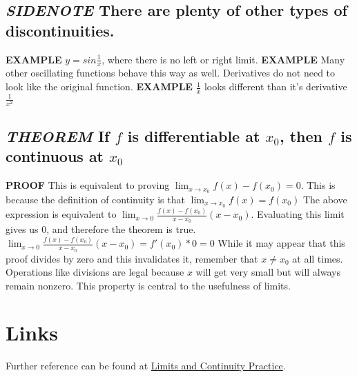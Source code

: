\documentclass[letterpaper]{article}
\begin{document}
\subsection{\emph{SIDENOTE} There are plenty of other types of discontinuities.}
\label{sec:org0b80d2d}
\textbf{EXAMPLE} \(y = sin \frac{1}{x}\), where there is no left or right limit.
\textbf{EXAMPLE} Many other oscillating functions behave this way as well.
Derivatives do not need to look like the original function.
\textbf{EXAMPLE} \(\frac{1}{x}\) looks different than it's derivative \(\frac{1}{x^2}\)
\subsection{\emph{THEOREM} If \(f\) is differentiable at \(x_0\), then \(f\) is continuous at \(x_0\)}
\label{sec:org248d62a}
\textbf{PROOF}
This is equivalent to proving \(\lim_{x \rightarrow x_0} f(x) - f(x_0) = 0\).
  This is because the definition of continuity is that \(\lim_{x \rightarrow x_0} f(x) = f(x_0)\)
The above expression is equivalent to \(\lim_{x\rightarrow0} \frac{f(x) - f(x_0)}{x-x_0} (x-x_0)\).
Evaluating this limit gives us 0, and therefore the theorem is true.
\(\lim_{x\rightarrow0} \frac{f(x) - f(x_0)}{x-x_0} (x-x_0) = f'(x_0) * 0 = 0\)
While it may appear that this proof divides by zero and this invalidates it, remember that \(x \neq x_0\) at all times. Operations like divisions are legal because \(x\) will get very small but will always remain nonzero. This property is central to the usefulness of limits.

\section{Links}
\label{sec:org2ee21e5}

Further reference can be found at \href{limits-continuity-problems.org}{Limits and Continuity Practice}.
\end{document}
